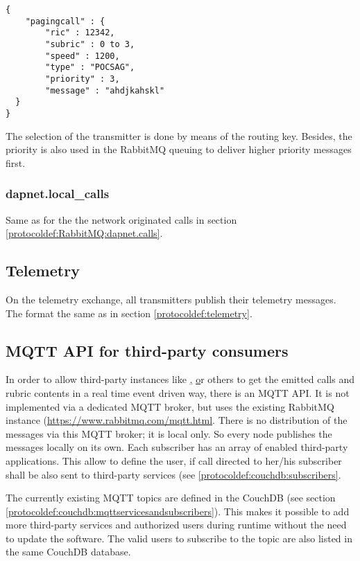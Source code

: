 \begin{lstlisting}
{
	"pagingcall" : {
		"ric" : 12342,
		"subric" : 0 to 3,
		"speed" : 1200,
		"type" : "POCSAG",
		"priority" : 3,
		"message" : "ahdjkahskl"
  }
}
\end{lstlisting}
The selection of the transmitter is done by means of the routing key. Besides, the priority is also used in the RabbitMQ queuing to deliver higher priority messages first.


\subsubsection{dapnet.local\_calls}
\label{protocoldef:RabbitMQ:dapnet.local_calls}
Same as for the the network originated calls in section \ref{protocoldef:RabbitMQ:dapnet.calls}.



\subsection{Telemetry}
On the telemetry exchange, all transmitters publish their telemetry messages. The format the same as in section \ref{protocoldef:telemetry}.

\subsection{MQTT API for third-party consumers}
\label{protocoldef:mqttapi}
In order to allow third-party instances like \href{http://www.aprs-is.net/|APRS}, \href{http://brandmeister.network|Brandmeister} or others to get the emitted calls and rubric contents in a real time event driven way, there is an MQTT API. It is not implemented via a dedicated MQTT broker, but uses the existing RabbitMQ instance (\url{https://www.rabbitmq.com/mqtt.html}. There is no distribution of the messages via this MQTT broker; it is local only. So every node publishes the messages locally on its own.
Each subscriber has an array of enabled third-party applications. This allow to define the user, if call directed to her/his subscriber shall be also sent to third-party services (see \ref{protocoldef:couchdb:subscribers}.

The currently existing MQTT topics are defined in the CouchDB (see section \ref{protocoldef:couchdb:mqttservicesandsubscribers}). This makes it possible to add more third-party services and authorized users during runtime without the need to update the software.
The valid users to subscribe to the topic are also listed in the same CouchDB database.

